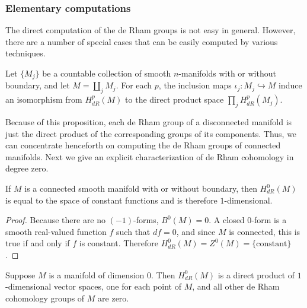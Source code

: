 \subsubsection{Elementary computations}
The direct computation of the de Rham groups is not easy in general. However, there are a number of special cases that can be easily computed by various techniques. 
\begin{proposition}
Let $\{M_j\}$ be a countable collection of smooth $n$-manifolds with or without boundary, and let $M=\amalg_jM_j$. For each $p$, the inclusion maps $\iota_j:M_j\hookrightarrow M$ induce an isomorphism from $H^p_{dR}(M)$ to the direct product space $\prod_jH^p_{dR}(M_j)$.
\end{proposition}
Because of this proposition, each de Rham group of a disconnected manifold is just the direct product of the corresponding groups of its components. Thus, we can concentrate henceforth on computing the de Rham groups of connected manifolds. Next we give an explicit characterization of de Rham cohomology in degree zero.
\begin{proposition}\label{cohomology degree 0}
If $M$ is a connected smooth manifold with or without boundary, then $H^0_{dR}(M)$ is equal to the space of constant functions and is therefore $1$-dimensional.
\end{proposition}
\begin{proof}
Because there are no $(-1)$-forms, $B^0(M)=0$. A closed $0$-form is a smooth real-valued function $f$ such that $df=0$, and since $M$ is connected, this is true if
and only if $f$ is constant. Therefore $H^0_{dR}(M)=Z^0(M)=\{\text{constant}\}$.
\end{proof}
\begin{corollary}
Suppose $M$ is a manifold of dimension $0$. Then $H^0_{dR}(M)$ is a direct product of $1$-dimensional vector spaces, one for each point of $M$, and all other de Rham cohomology groups of $M$ are zero.
\end{corollary}

